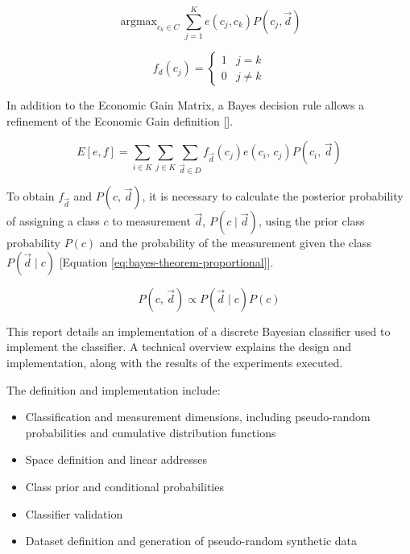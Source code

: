 \documentclass[letterpaper, conference]{IEEEtran}
\DeclareMathOperator*{\argmax}{argmax}
\begin{document}
\begin{equation}\label{eq:bayes-argmax}
  \argmax_{c_k \in C} \sum_{j = 1}^{K} e(c_j, c_k)\mathbin{}P(c_j, \vec{d})
\end{equation}

\begin{equation}\label{eq:bayes-rule}
  f_d(c_j) =
  \begin{cases}
  1 & j = k \\
  0 & j \neq k
  \end{cases}
\end{equation}

In addition to the Economic Gain Matrix, a Bayes decision rule allows a refinement of the Economic Gain definition [\label{eq:bayes-expected-gain}].

\begin{equation}\label{eq:bayes-expected-gain}
  E[e, f] = \sum_{i \in K} \sum_{j \in K}\sum_{\vec{d} \in D}f_{\vec{d}}(c_j)\mathbin{}e(c_i,\, c_j)\mathbin{}P(c_i,\,\vec{d})
\end{equation}

To obtain $f_{\vec{d}}$ and $P(c,\, \vec{d})$, it is necessary to calculate the posterior probability of assigning a class $c$ to measurement $\vec{d}$, $P(c \mid \vec{d})$, using the prior class probability $P(c)$ and the probability of the measurement given the class $P(\vec{d} \mid c)$ [Equation \ref{eq:bayes-theorem-proportional}].

\begin{equation} \label{eq:bayes-theorem-proportional}
  P(c,\, \vec{d}) \mathbin{\propto} P(\vec{d} \mid c) \mathbin{} P(c)
\end{equation}

This report details an implementation of a discrete Bayesian classifier used to implement the classifier. A technical overview explains the design and implementation, along with the results of the experiments executed.

The definition and implementation include:

\begin{itemize}
  \item Classification and measurement dimensions, including pseudo-random probabilities and cumulative distribution functions
  \item Space definition and linear addresses
  \item Class prior and conditional probabilities
  \item Classifier validation
  \item Dataset definition and generation of pseudo-random synthetic data
\end{itemize}
\end{document}
